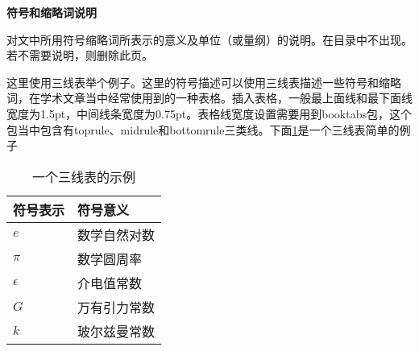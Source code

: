 \begin{center}
    \heiti\sanhao\bfseries{符号和缩略词说明}
    \vspace{1cm}
\end{center}

对文中所用符号缩略词所表示的意义及单位（或量纲）的说明。在目录中不出现。若不需要说明，则删除此页。

这里使用三线表举个例子。这里的符号描述可以使用三线表描述一些符号和缩略词，在学术文章当中经常使用到的一种表格。插入表格，一般最上面线和最下面线宽度为1.5pt，中间线条宽度为0.75pt。表格线宽度设置需要用到booktabs包，这个包当中包含有toprule、midrule和bottomrule三类线。下面\cref{tab:latex-sys-def}是一个三线表简单的例子
\begin{table}[hbpt]
    \centering
    \linespread{1.2}
    \caption{一个三线表的示例}
    \begin{tabular}{p{}<{\centering}p{}<{\centering}}
        \toprule[1.5pt]
        符号表示 & 符号意义\\
        \midrule[0.75pt]
        $e$& 数学自然对数\\
        $\pi$& 数学圆周率\\
        $\epsilon$ & 介电值常数\\
        $G$ & 万有引力常数\\
        $k$ & 玻尔兹曼常数\\
        \bottomrule[1.5pt]
    \end{tabular}
    \label{tab:latex-sys-def}
\end{table}
\newpage
%
